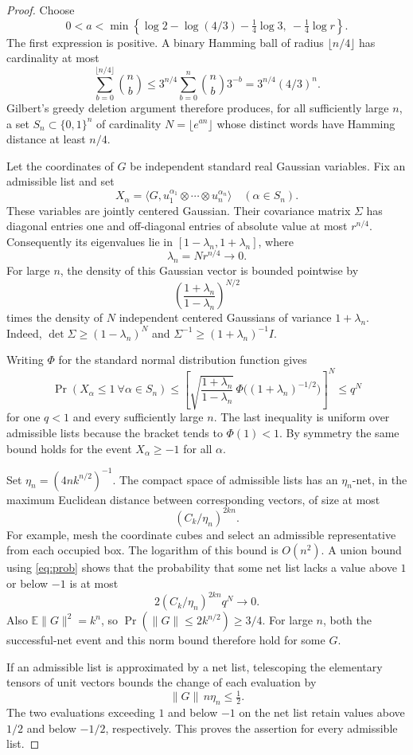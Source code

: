 \begin{proof}
Choose
\[
 0<a<\min\left\{\log2-\log(4/3)-\tfrac14\log3,\ -\tfrac14\log r\right\}.
\]
The first expression is positive. A binary Hamming ball of radius \(\lfloor n/4\rfloor\) has cardinality at most
\[
 \sum_{b=0}^{\lfloor n/4\rfloor}\binom nb
 \leq 3^{n/4}\sum_{b=0}^n\binom nb3^{-b}
 =3^{n/4}(4/3)^n.
\]
Gilbert's greedy deletion argument \cite[Theorem~1]{Gilbert}
therefore produces, for all sufficiently large \(n\), a set \(S_n\subset\{0,1\}^n\) of cardinality \(N=\lfloor e^{an}\rfloor\) whose distinct words have Hamming distance at least \(n/4\).

Let the coordinates of \(G\) be independent standard real Gaussian variables. Fix an admissible list and set
\[
 X_\alpha=\langle G,u_1^{\alpha_1}\otimes\cdots\otimes u_n^{\alpha_n}\rangle
 \quad(\alpha\in S_n).
\]
These variables are jointly centered Gaussian. Their covariance matrix \(\Sigma\) has diagonal entries one and off-diagonal entries of absolute value at most \(r^{n/4}\). Consequently its eigenvalues lie in \([1-\lambda_n,1+\lambda_n]\), where
\[
 \lambda_n=N r^{n/4}\longrightarrow0.
\]
For large \(n\), the density of this Gaussian vector is bounded pointwise by
\[
 \left(\frac{1+\lambda_n}{1-\lambda_n}\right)^{N/2}
\]
times the density of \(N\) independent centered Gaussians of variance \(1+\lambda_n\). Indeed, \(\det\Sigma\geq(1-\lambda_n)^N\) and \(\Sigma^{-1}\geq(1+\lambda_n)^{-1}I\).

Writing \(\Phi\) for the standard normal distribution function gives
\begin{equation}\label{eq:prob}
 \Pr(X_\alpha\leq1\ \forall\alpha\in S_n)
 \leq\left[\sqrt{\frac{1+\lambda_n}{1-\lambda_n}}\,
 \Phi\big((1+\lambda_n)^{-1/2}\big)\right]^N
 \leq q^N
\end{equation}
for one \(q<1\) and every sufficiently large \(n\). The last inequality is uniform over admissible lists because the bracket tends to \(\Phi(1)<1\). By symmetry the same bound holds for the event \(X_\alpha\geq-1\) for all \(\alpha\).

Set \(\eta_n=(4n k^{n/2})^{-1}\). The compact space of admissible lists has an \(\eta_n\)-net, in the maximum Euclidean distance between corresponding vectors, of size at most
\[
 (C_k/\eta_n)^{2kn}.
\]
For example, mesh the coordinate cubes and select an admissible representative from each occupied box. The logarithm of this bound is \(O(n^2)\). A union bound using \eqref{eq:prob} shows that the probability that some net list lacks a value above \(1\) or below \(-1\) is at most
\[
 2(C_k/\eta_n)^{2kn}q^N\longrightarrow0.
\]
Also \(\mathbb E\|G\|^2=k^n\), so
\(\Pr(\|G\|\leq2k^{n/2})\geq3/4\).
For large \(n\), both the successful-net event and this norm bound therefore hold for some \(G\).

If an admissible list is approximated by a net list, telescoping the elementary tensors of unit vectors bounds the change of each evaluation by
\[
 \|G\|\,n\eta_n\leq\tfrac12.
\]
The two evaluations exceeding \(1\) and below \(-1\) on the net list retain values above \(1/2\) and below \(-1/2\), respectively. This proves the assertion for every admissible list.
\end{proof}

